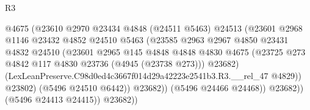 \begin{lexlean}{R3}
\begin{coremodule}
                                            @4675
                                            (@23610
                                              @2970
                                              @23434
                                              @4848
                                              (@24511 @5463)
                                              @24513
                                              (@23601
                                                @2968
                                                @1146
                                                @23432
                                                @4852
                                                @24510
                                                @5463
                                                (@23585
                                                  @2963
                                                  @2967
                                                  @4850
                                                  @23431
                                                  @4832
                                                  @24510
                                                  (@23601
                                                    @2965
                                                    @145
                                                    @4848
                                                    @4848
                                                    @4830
                                                    @4675
                                                    (@23725
                                                      @273
                                                      @4842
                                                      @117
                                                      @4830
                                                      @23736
                                                      (@4945 (@23738 @273)))
                                                    @23682)
                                                  (LexLeanPreserve.C98d0ed4c3667f014d29a42223e2541b3.R3.__rel_47
                                                    @4829))
                                                @23802)
                                              (@5496 @24510 @6442))
                                            @23682))
                                        (@5496 @24466 @24468))
                                      @23682))
                                  (@5496 @24413 @24415))
                                @23682))

\end{coremodule}
\end{lexlean}
